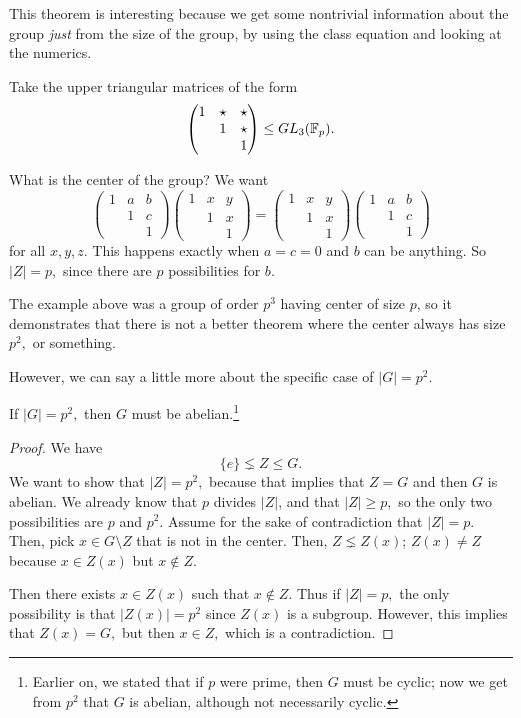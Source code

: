 This theorem is interesting because we get some nontrivial information about the group \emph{just} from the size of the group, by using the class equation and looking at the numerics.

\begin{example}
Take the upper triangular matrices of the form \[\begin{pmatrix}
1 & \star & \star \\
 & 1 & \star \\
 & & 1
\end{pmatrix} \leq GL_3(\mathbb F_p).\]

What is the center of the group? We want \[\begin{pmatrix}
1 & a & b \\
 & 1 & c \\
 & & 1
\end{pmatrix}
\begin{pmatrix} 1 & x & y \\
 & 1 & x \\
 & & 1
\end{pmatrix} = \begin{pmatrix}1 & x & y \\
 & 1 & x \\
 & & 1
\end{pmatrix}\begin{pmatrix}1 & a & b \\
 & 1 & c \\
 & & 1
\end{pmatrix}\] for all $x, y, z.$
This happens exactly when $a = c = 0$ and $b$ can be anything. So $|Z| = p,$ since there are $p$ possibilities for $b.$

\end{example}

The example above was a group of order $p^3$ having center of size $p$, so it demonstrates that there is not a better theorem where the center always has size $p^2,$ or something. 

However, we can say a little more about the specific case of $|G| = p^2$.
\begin{corollary}
If $|G| = p^2,$ then $G$ must be abelian.\footnote{Earlier on, we stated that if $p$ were prime, then $G$ must be cyclic; now we get from $p^2$ that $G$ is abelian, although not necessarily cyclic.} 
\end{corollary}

\begin{proof}
We have 
\[
\{e\} \lneq Z \leq G.
\]
We want to show that $|Z| = p^2,$ because that implies that $Z = G$ and then $G$ is abelian. We already know that $p$ divides $|Z|$, and that $|Z| \geq p,$ so the only two possibilities are $p$ and $p^2.$ Assume for the sake of contradiction that $|Z| = p.$ Then, pick $x \in G \setminus Z$ that is not in the center. Then, $Z \lneq Z(x)$; $Z(x) \neq Z$ because $x \in Z(x)$ but $x \not \in Z$. 

Then there exists $x \in Z(x)$ such that $x \notin Z.$ Thus if $|Z| = p,$ the only possibility is that $|Z(x)| = p^2$ since $Z(x)$ is a subgroup.
However, this implies that $Z(x) = G,$ but then $x \in Z,$ which is a contradiction. 
\end{proof}

